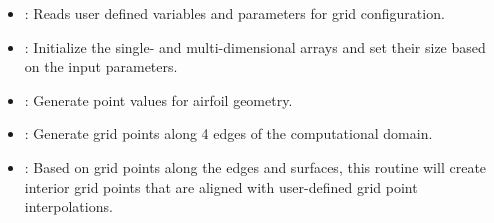 \documentclass[letterpaper,10pt,english]{sphinxmanual}
\begin{document}
\begin{sphinxVerbatim}[commandchars=\\\{\}]
 

         
           

         

          

         
         
         
         
         

  
\end{sphinxVerbatim}
\begin{itemize}
\item {} 
: Reads  user defined variables and parameters for grid configuration.

\item {} 
: Initialize the single- and multi-dimensional arrays and set their size based on the input parameters.

\item {} 
: Generate point values for airfoil geometry.

\item {} 
: Generate grid points along 4 edges of the computational domain.

\item {} 
: Based on grid points along the edges and surfaces, this routine will create interior grid points that are aligned with user-defined grid point interpolations.

\end{itemize}
\end{document}
